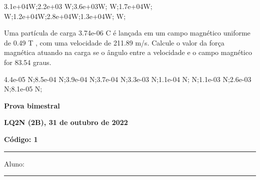 \documentclass[12pt, addpoints]{exam}
\begin{document}
\begin{questions}
\begin{multicols*}{2}
\begin{oneparchoices}
\choice 3.1e+04W;\choice 2.2e+03 W;\choice 3.6e+03W; W;\choice 1.7e+04W; W;\choice 1.2e+04W;\choice 2.8e+04W;\choice 1.3e+04W; W;\end{oneparchoices}
\question[20] Uma partícula de carga 3.74e-06 C é lançada em um campo magnético uniforme de    0.49 T , com uma velocidade de 211.89 m/s. Calcule o valor da força magnética atuando na carga se o ângulo entre a velocidade e o campo magnético for   83.54 graus.

\begin{oneparchoices}
\choice 4.4e-05 N;\choice 8.5e-04 N;\choice 3.9e-04 N;\choice 3.7e-04 N;\choice 3.3e-03 N;\choice 1.1e-04 N; N;\choice 1.1e-03 N;\choice 2.6e-03 N;\choice 8.1e-05 N;\end{oneparchoices}
\end{multicols*}
\end{questions}
\newpage
        \begin{minipage}[b]{0.75\linewidth}
            \begin{flushleft}
                {\bf \large Prova bimestral}
            \end{flushleft}
            \begin{flushleft}
                {\bf \large LQ2N (2B), 31 de outubro de 2022}
            \end{flushleft}
        \end{minipage}
        \begin{minipage}[b]{0.20\linewidth}
            \begin{flushright}
                {\bf \large Código: 1}
            \end{flushright}
        \end{minipage}
        \vspace{0.5cm} \hrule \vspace{0.5cm}
        \begin{minipage}{0.75\linewidth}
            Aluno:
        \end{minipage}
        \vspace{0.5cm} \hrule \vspace{0.5cm}
\end{document}
